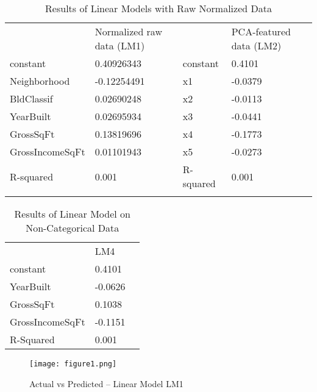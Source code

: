 \documentclass[10pt,twocolumn]{article}
\begin{document}
\begin{center}
\begin{table*}[]
\centering
\caption{Results of Linear Models with Raw Normalized Data}
\label{my-label}
\begin{tabular}{lllll}
                & Normalized raw data (LM1) &          & PCA-featured data (LM2) & \\
constant        & 0.40926343                & constant & 0.4101                  & \\
Neighborhood    & -0.12254491               & x1       & -0.0379                 & \\
BldClassif      & 0.02690248                & x2       & -0.0113                 & \\
YearBuilt       & 0.02695934                & x3       & -0.0441                 & \\
GrossSqFt       & 0.13819696                & x4       & -0.1773                 & \\
GrossIncomeSqFt & 0.01101943                & x5       & -0.0273                 & \\
R-squared       & 0.001                     & R-squared& 0.001                   & \\
                &                           &          &                         &
\end{tabular}
\end{table*}
\end{center}

\begin{table*}[]
\centering
\caption{Results of Linear Model on Non-Categorical Data}
\label{my-label}
\begin{tabular}{lll}
                & LM4        &  \\
constant        & 0.4101     &  \\
YearBuilt       & -0.0626    &  \\
GrossSqFt       & 0.1038     &  \\
GrossIncomeSqFt & -0.1151 &  \\
R-Squared       & 0.001     &
\end{tabular}
\end{table*}

\begin{figure*}[]
  \begin{center}
    \texttt{[image: figure1.png]}
  \end{center}

  \caption{\small Actual vs Predicted -- Linear Model LM1}
  \label{fig-1}
\end{figure*}
\end{document}
